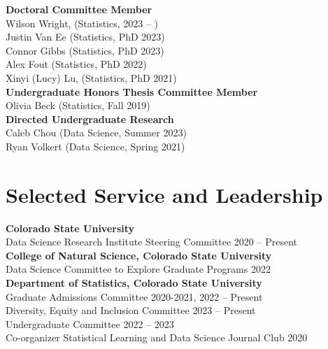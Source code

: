 \documentclass[margin,line]{res}
\begin{document}
\begin{resume}
{\bf Doctoral Committee Member} \hfill \\
Wilson Wright, (Statistics, 2023 -- )\\
Justin Van Ee (Statistics, PhD 2023) \\
Connor Gibbs (Statistics, PhD 2023)  \\
Alex Fout (Statistics, PhD 2022) \\
Xinyi (Lucy) Lu, (Statistics, PhD 2021) \\

\vspace{-.5cm}
{\bf Undergraduate Honors Thesis Committee Member} \hfill \\
Olivia Beck (Statistics, Fall 2019) \\

\vspace{-.5cm}
{\bf Directed Undergraduate Research} \hfill \\
Caleb Chou (Data Science, Summer 2023) \\
Ryan Volkert (Data Science, Spring 2021) \\

\section{\sc Selected Service and Leadership}

{\bf Colorado State University} \\
Data Science Research Institute Steering Committee \hfill {2020 -- Present} \\

\vspace{-.3cm}
{\bf College of Natural Science, Colorado State University} \\
Data Science Committee to Explore Graduate Programs \hfill {2022} \\

\vspace{-.3cm}
{\bf Department of Statistics, Colorado State University} \\
Graduate Admissions Committee \hfill {2020-2021, 2022 -- Present} \\
Diversity, Equity and Inclusion Committee \hfill {2023 -- Present} \\
Undergraduate Committee \hfill {2022 -- 2023} \\
Co-organizer Statistical Learning and Data Science Journal Club \hfill {2020} \\


\end{resume}
\end{document}
